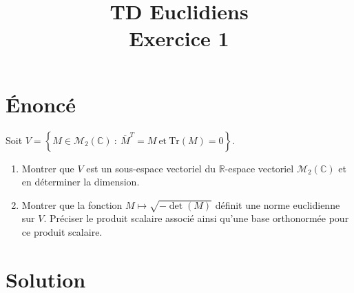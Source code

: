 \documentclass[french]{article}
\title{TD Euclidiens\\ Exercice 1}
\date{}
\newcommand{\R}{\mathbb{R}}
\newcommand{\C}{\mathbb{C}}
\newcommand{\Tr}{\text{Tr}}
\begin{document}
\maketitle

\section{Énoncé}
Soit $V=\left\{M\in\mathcal{M}_2(\C)\ : \ \overline{M}^T=M\ \text{et}\ \Tr(M)=0\right\}$.
\begin{enumerate}
	\item Montrer que $V$ est un sous-espace vectoriel du $\R$-espace vectoriel $\mathcal{M}_2(\C)$ et en déterminer la dimension.
	\item Montrer que la fonction $M\mapsto\sqrt{-\det(M)}$ définit une norme euclidienne sur $V$. Préciser le produit scalaire associé ainsi qu'une base orthonormée pour ce produit scalaire.
\end{enumerate}
\section{Solution}
\end{document}
